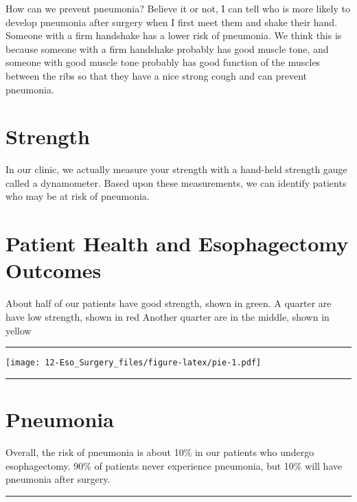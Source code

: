 \documentclass[
]{article}
\begin{document}
How can we prevent pneumonia? Believe it or not, I can tell who is more
likely to develop pneumonia after surgery when I first meet them and
shake their hand. Someone with a firm handshake has a lower risk of
pneumonia. We think this is because someone with a firm handshake
probably has good muscle tone, and someone with good muscle tone
probably has good function of the muscles between the ribs so that they
have a nice strong cough and can prevent pneumonia.

\hypertarget{strength}{%
\section{Strength}\label{strength}}

In our clinic, we actually measure your strength with a hand-held
strength gauge called a dynamometer. Based upon these measurements, we
can identify patients who may be at risk of pneumonia.

\hypertarget{patient-health-and-esophagectomy-outcomes}{%
\section{Patient Health and Esophagectomy
Outcomes}\label{patient-health-and-esophagectomy-outcomes}}

About half of our patients have good strength, shown in green. A quarter
are have low strength, shown in red Another quarter are in the middle,
shown in yellow

\begin{center}\rule{0.5\linewidth}{0.5pt}\end{center}

\texttt{[image: 12-Eso\_Surgery\_files/figure-latex/pie-1.pdf]}

\begin{center}\rule{0.5\linewidth}{0.5pt}\end{center}

\hypertarget{pneumonia-1}{%
\section{Pneumonia}\label{pneumonia-1}}

Overall, the risk of pneumonia is about 10\% in our patients who undergo
esophagectomy. 90\% of patients never experience pneumonia, but 10\%
will have pneumonia after surgery.

\begin{center}\rule{0.5\linewidth}{0.5pt}\end{center}
\end{document}
